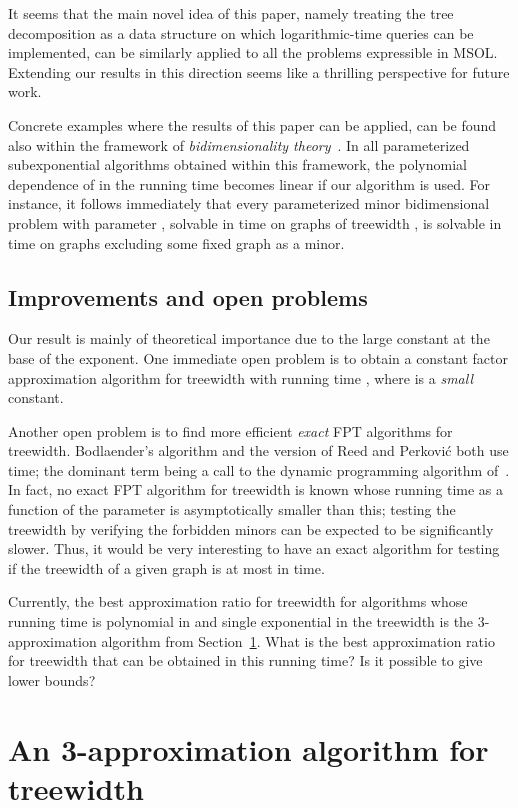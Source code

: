 \documentclass[a4paper,11pt]{article}
\theoremstyle{definition}
\theoremstyle{remark}
\begin{document}
It seems that the main novel idea of this paper, namely treating the
tree decomposition as a data structure on which logarithmic-time
queries can be implemented, can be similarly applied to all the
problems expressible in MSOL.  Extending our results in this direction
seems like a thrilling perspective for future work.

Concrete examples where the results of this paper can be applied, can
be found also within the framework of \emph{bidimensionality
  theory}~\cite{DemaineFHT05a, DemaineH08}.  In all parameterized
subexponential algorithms obtained within this framework, the
polynomial dependence of  in the running time becomes linear if our
algorithm is used.  For instance, it follows immediately that every
parameterized minor bidimensional problem with parameter , solvable
in time  on graphs of treewidth , is solvable in time
 on graphs excluding some fixed graph as a minor.


\subsection{Improvements and open problems}
Our result is mainly of theoretical importance due to the large
constant  at the base of the exponent.  One immediate open problem
is to obtain a constant factor approximation algorithm for treewidth
with running time , where  is a \emph{small} constant.

Another open problem is to find more efficient \emph{exact} FPT
algorithms for treewidth.  Bodlaender's algorithm \cite{Bodlaender96}
and the version of Reed and Perkovi{\'{c}} both use 
time; the dominant term being a call to the dynamic programming
algorithm of~\cite{BodlaenderK96}.  In fact, no exact FPT algorithm
for treewidth is known whose running time as a function of the
parameter  is asymptotically smaller than this; testing the
treewidth by verifying the forbidden minors can be expected to be
significantly slower.  Thus, it would be very interesting to have an
exact algorithm for testing if the treewidth of a given graph is at
most  in  time.

Currently, the best approximation ratio for treewidth for algorithms
whose running time is polynomial in  and single exponential in the
treewidth is the 3-approximation algorithm from
Section~\ref{section:nlogn}.  What is the best approximation ratio for
treewidth that can be obtained in this running time? Is it possible to
give lower bounds?

\section{An  3-approximation algorithm for treewidth}
\label{section:nlogn}
\end{document}
